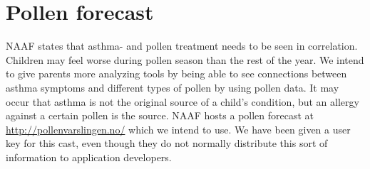 \section{Pollen forecast}
\label{sec:pollencast}
NAAF\cite{naafasthma} states that asthma- and pollen treatment needs to be seen in correlation.
Children may feel worse during pollen season than the rest of the year. We intend to give parents more analyzing tools by being able to see
connections between asthma symptoms and different types of pollen by using pollen data. It may occur that asthma is not the original source of 
a child's condition, but an allergy against a certain pollen is the source.  
NAAF hosts a pollen forecast at \url{http://pollenvarslingen.no/} which we intend to use. We have been given a user key for this cast, even though
they do not normally distribute this sort of information to application developers.